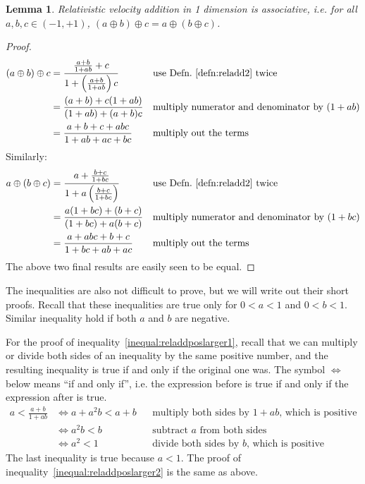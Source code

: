 \documentclass[a4paper]{article}
\theoremstyle{plain}
\newtheorem{lemma}[theorem]{Lemma}
\theoremstyle{definition}
\begin{document}
\begin{lemma}
\label{lem:1dRelVelAddAssociative}
Relativistic velocity addition in 1 dimension is associative, i.e.
for all $a, b, c \in (-1, +1)$,
$(a \oplus b) \oplus c = a \oplus (b \oplus c)$.
\end{lemma}

\begin{proof}
\begin{align*}
(a \oplus b) \oplus c
  & = \frac{\frac{a+b}{1+ab}+c}{1+\left(\frac{a+b}{1+ab}\right)c} & & \text{use Defn.~\eqref{defn:reladd2} twice} \\
  & = \frac{(a+b)+c(1+ab)}{(1+ab)+(a+b)c} & & \text{multiply numerator and denominator by $(1+ab)$} \\
  & = \frac{a+b+c+abc}{1+ab+ac+bc} & & \text{multiply out the terms}
\end{align*}
Similarly:
\begin{align*}
a \oplus (b \oplus c)
  & = \frac{a+\frac{b+c}{1+bc}}{1+a\left(\frac{b+c}{1+bc}\right)} & & \text{use Defn.~\eqref{defn:reladd2} twice} \\
  & = \frac{a(1+bc)+(b+c)}{(1+bc)+a(b+c)} & & \text{multiply numerator and denominator by $(1+bc)$} \\
  & = \frac{a+abc+b+c}{1+bc+ab+ac} & & \text{multiply out the terms}
\end{align*}
The above two final results are easily seen to be equal.
\end{proof}

The inequalities are also not difficult to prove, but we will write
out their short proofs.  Recall that these inequalities are true only
for $0 < a < 1$ and $0 < b < 1$.  Similar inequality hold if both $a$
and $b$ are negative.

For the proof of inequality~\eqref{inequal:reladdposlarger1}, recall
that we can multiply or divide both sides of an inequality by the same
positive number, and the resulting inequality is true if and only if
the original one was.  The symbol $\Leftrightarrow$ below means ``if
and only if'', i.e. the expression before is true if and only if the
expression after is true.
\begin{align*}
a < \frac{a+b}{1+ab}
  & \Leftrightarrow a + a^2 b < a+b & & \text{multiply both sides by $1+ab$, which is positive} \\
  & \Leftrightarrow a^2 b < b & & \text{subtract $a$ from both sides} \\
  & \Leftrightarrow a^2 < 1 & & \text{divide both sides by $b$, which is positive}
\end{align*}
The last inequality is true because $a < 1$.
The proof of inequality~\eqref{inequal:reladdposlarger2} is the same
as above.
\end{document}
